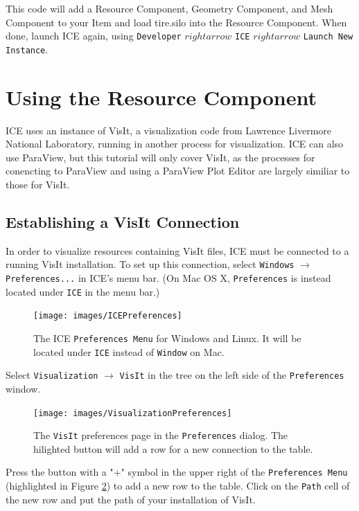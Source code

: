 This code will add a Resource Component, Geometry Component, and Mesh Component
to your Item and load tire.silo into the Resource Component. When done, launch
ICE again, using \texttt{Developer} $rightarrow$ \texttt{ICE} $rightarrow$
\texttt{Launch New Instance}.

\section{Using the Resource Component}

ICE uses an instance of VisIt, a visualization code from Lawrence Livermore
National Laboratory, running in another process for visualization. ICE can also
use ParaView, but this tutorial will only cover VisIt, as the processes for
conencting to ParaView and using a ParaView Plot Editor are largely similiar to
those for VisIt.

\subsection{Establishing a VisIt Connection}

In order to visualize resources containing VisIt files, ICE must be connected to
a running VisIt installation. To set up this connection, select \texttt{Windows}
$\rightarrow$ \texttt{Preferences...} in ICE's menu bar. (On Mac OS X,
\texttt{Preferences} is instead located under \texttt{ICE} in the menu
bar.)

\begin{figure}[!h]
\texttt{[image: images/ICEPreferences]}
\centering
\caption{The ICE \texttt{Preferences Menu} for Windows and Linux. It will be
located under \texttt{ICE} instead of \texttt{Window} on Mac.}
\label{fig:icepreferences}
\end{figure}


Select \texttt{Visualization} $\rightarrow$ \texttt{VisIt} in the tree on the
left side of the \texttt{Preferences} window.

\begin{figure}[!h]
\texttt{[image: images/VisualizationPreferences]}
\centering
\caption{The \texttt{VisIt} preferences page in the \texttt{Preferences}
dialog. The hilighted button will add a row for a new connection to the table.}
\label{fig:visualizationpreferences}
\end{figure}


Press the button with a "+" symbol in the upper right of the
\texttt{Preferences Menu} (highlighted in Figure
\ref{fig:visualizationpreferences}) to add a new row to the table.
Click on the \texttt{Path} cell of the new row and put the path of your installation of VisIt.

